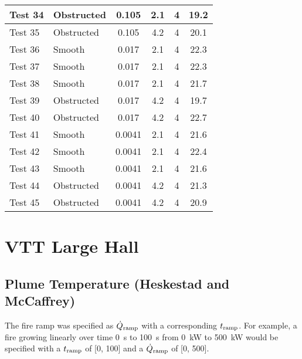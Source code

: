 \begin{table}[!ht]
\begin{center}
\begin {tabular}{|l|l|c|c|c|c|}
Test 34    &  Obstructed    &  0.105            &  2.1        &  4              &  19.2                  \\ \hline
Test 35    &  Obstructed    &  0.105            &  4.2        &  4              &  20.1                  \\ \hline
Test 36    &  Smooth        &  0.017            &  2.1        &  4              &  22.3                  \\ \hline
Test 37    &  Smooth        &  0.017            &  2.1        &  4              &  22.3                  \\ \hline
Test 38    &  Smooth        &  0.017            &  2.1        &  4              &  21.7                  \\ \hline
Test 39    &  Obstructed    &  0.017            &  4.2        &  4              &  19.7                  \\ \hline
Test 40    &  Obstructed    &  0.017            &  4.2        &  4              &  22.7                  \\ \hline
Test 41    &  Smooth        &  0.0041           &  2.1        &  4              &  21.6                  \\ \hline
Test 42    &  Smooth        &  0.0041           &  2.1        &  4              &  22.4                  \\ \hline
Test 43    &  Smooth        &  0.0041           &  2.1        &  4              &  21.6                  \\ \hline
Test 44    &  Obstructed    &  0.0041           &  4.2        &  4              &  21.3                  \\ \hline
Test 45    &  Obstructed    &  0.0041           &  4.2        &  4              &  20.9                  \\ \hline
\end{tabular}
\end{center}
\end{table}


\clearpage


\section{VTT Large Hall}

\subsection*{Plume Temperature (Heskestad and McCaffrey)}

The fire ramp was specified as $\dot Q\sb{ramp}$ with a corresponding $t\sb{ramp}$.
For example, a fire growing linearly over time 0~s to 100~s from 0~kW to 500~kW
would be specified with a $t\sb{ramp}$ of [0, 100] and a $\dot Q\sb{ramp}$ of [0, 500].

